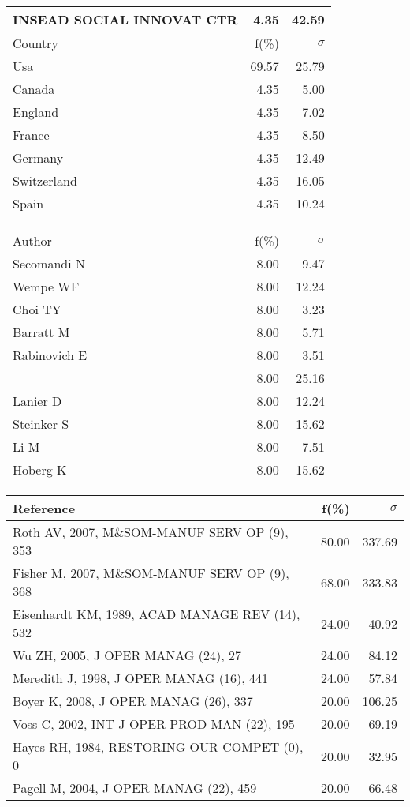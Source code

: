 \documentclass[a4paper,11pt]{report}
\begin{document}
\begin{landscape}
\begin{table}[!ht]
{\begin{tabular}{|l r r|}
INSEAD SOCIAL INNOVAT CTR & 4.35 & 42.59\\
\hline
\hline
Country & f(\%) & $\sigma$\\
\hline
Usa & 69.57 & 25.79\\
Canada & 4.35 & 5.00\\
England & 4.35 & 7.02\\
France & 4.35 & 8.50\\
Germany & 4.35 & 12.49\\
Switzerland & 4.35 & 16.05\\
Spain & 4.35 & 10.24\\
 &  & \\
 &  & \\
 &  & \\
\hline
\hline
Author & f(\%) & $\sigma$\\
\hline
Secomandi N & 8.00 & 9.47\\
Wempe WF & 8.00 & 12.24\\
Choi TY & 8.00 & 3.23\\
Barratt M & 8.00 & 5.71\\
Rabinovich E & 8.00 & 3.51\\
[anonymous] & 8.00 & 25.16\\
Lanier D & 8.00 & 12.24\\
Steinker S & 8.00 & 15.62\\
Li M & 8.00 & 7.51\\
Hoberg K & 8.00 & 15.62\\
\hline
\end{tabular}
}
{\scriptsize\begin{tabular}{|l r r|}
\hline
Reference & f(\%) & $\sigma$\\
\hline
Roth AV, 2007, M\&SOM-MANUF SERV OP (9), 353 & 80.00 & 337.69\\
Fisher M, 2007, M\&SOM-MANUF SERV OP (9), 368 & 68.00 & 333.83\\
Eisenhardt KM, 1989, ACAD MANAGE REV (14), 532 & 24.00 & 40.92\\
Wu ZH, 2005, J OPER MANAG (24), 27 & 24.00 & 84.12\\
Meredith J, 1998, J OPER MANAG (16), 441 & 24.00 & 57.84\\
Boyer K, 2008, J OPER MANAG (26), 337 & 20.00 & 106.25\\
Voss C, 2002, INT J OPER PROD MAN (22), 195 & 20.00 & 69.19\\
Hayes RH, 1984, RESTORING OUR COMPET (0), 0 & 20.00 & 32.95\\
Pagell M, 2004, J OPER MANAG (22), 459 & 20.00 & 66.48\\

\end{tabular}}
\end{table}
\end{landscape}
\end{document}

